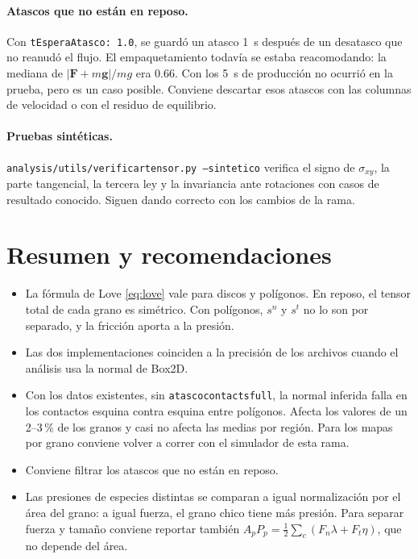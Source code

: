 \documentclass[11pt,a4paper]{article}
\newcommand{\vect}[1]{\mathbf{#1}}
\newcommand{\codeus}{\textunderscore\allowbreak}
\newcommand{\code}[1]{\texttt{\begingroup\let\_\codeus#1\endgroup}}
\begin{document}
\paragraph{Atascos que no están en reposo.} Con
\code{tEsperaAtasco: 1.0}, se guardó un atasco 1~s después de un
desatasco que no reanudó el flujo. El empaquetamiento todavía se estaba
reacomodando: la mediana de $|\vect{F}+m\vect{g}|/mg$ era $0.66$. Con los
5~s de producción no ocurrió en la prueba, pero es un caso posible.
Conviene descartar esos atascos con las columnas de velocidad o con el
residuo de equilibrio.

\paragraph{Pruebas sintéticas.} \code{analysis/utils/verificar\_tensor.py
--sintetico} verifica el signo de $\sigma_{xy}$, la parte tangencial, la
tercera ley y la invariancia ante rotaciones con casos de resultado
conocido. Siguen dando correcto con los cambios de la rama.

\section{Resumen y recomendaciones}

\begin{itemize}
  \item La fórmula de Love \eqref{eq:love} vale para discos y polígonos.
    En reposo, el tensor total de cada grano es simétrico. Con polígonos,
    $s^n$ y $s^t$ no lo son por separado, y la fricción aporta a la
    presión.
  \item Las dos implementaciones coinciden a la precisión de los
    archivos cuando el análisis usa la normal de Box2D.
  \item Con los datos existentes, sin \code{atasco\_contacts\_full}, la
    normal inferida falla en los contactos esquina contra esquina entre
    polígonos. Afecta los valores de un 2--3\,\% de los granos y casi no
    afecta las medias por región. Para los mapas por grano conviene
    volver a correr con el simulador de esta rama.
  \item Conviene filtrar los atascos que no están en reposo.
  \item Las presiones de especies distintas se comparan a igual
    normalización por el área del grano: a igual fuerza, el grano chico
    tiene más presión. Para separar fuerza y tamaño conviene reportar
    también $A_pP_p = \tfrac12\sum_c(F_n\lambda + F_t\eta)$, que no
    depende del área.
\end{itemize}
\end{document}
